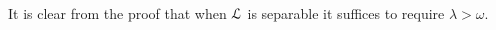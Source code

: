 \documentclass[10pt,oneside]{amsproc}
\newcommand{\mylabel}[1]{{#1}\hfill}
\renewenvironment{itemize}
  {\begin{list}{$\cdot$}{%
  \setlength{\parskip}{0mm}
  \setlength{\topsep}{.4\baselineskip}
  \setlength{\rightmargin}{0mm}
  \setlength{\listparindent}{0mm}
  \setlength{\itemindent}{0mm}
  \setlength{\labelwidth}{3ex}
  \setlength{\itemsep}{.2\baselineskip}
  \setlength{\parsep}{.2\baselineskip}
  \setlength{\partopsep}{0mm}
  \setlength{\labelsep}{1ex}
  \setlength{\leftmargin}{\labelwidth+\labelsep}
  \let\makelabel\mylabel}}{%
\end{list}}
\renewcommand*{\emph}[1]{%
   \smash{\tikz[baseline]\node[rectangle, fill=teal!25, rounded corners, inner xsep=0.5ex, inner ysep=0.2ex, anchor=base, minimum height = 2.7ex]{\strut #1};}}
\def\forallH{\forall}
\def\existsH{\exists}
\begin{document}
It is clear from the proof that when ${\EuScript L}$ is separable it suffices to require $\lambda>\omega$.

\begin{comment}
  
We say that the set $B$ is a \emph{Cauchy closure\/} of $A$ if 
\begin{itemize}
  \item[1.] every ${\sf I}$-invariant Cauchy type $p(x)\subseteq{\EuScript I}(A)$ is realized in $B$
  \item[2.] ${\EuScript I}\mbox{-tp}(b/A)$ is Cauchy for every $b\in B$.
\end{itemize}

\begin{proposition}\label{prop_Cauchyclosure}
  Assume $L_{\sf H}$ is a functional language.
  Let $M$ be model.
  Then any Cauchy closure of $M$ is a model.
\end{proposition}

\begin{proof} ???
\end{proof}
  {\color{blue}
  (messy/wrong/incomplete)
  We need a few easy observations.
  Let $a\sim_{\sf I}a'$ be finite tuples.
  Let $\langle a\rangle$ be the $L_{\sf H}$ substructure of $U$ generated by $a$.
  Then for every $b\in U\smallsetminus\langle a\rangle$ there is a $b'\in U\smallsetminus\langle a'\rangle$ such that $a,b\sim_{\sf I}a',b'$.
  In fact, $\sim_{\sf I}$-classes are infinite, hence they ave the cardinality of $U$.
  Therefore, by back-and-forth, $a\equiv a'$.
  We also have that for every formula $\varphi(x,z)$ and $b\in U\smallsetminus\big(\langle a\rangle\cup\big)$ 

  \ceq{}{~}{\forallH x\notin{\rm rng}(a,a')\big[\varphi(x,a)\leftrightarrow\varphi(x,a')\big].}

  Let $N$ be a Cauchy closure of $M$.
  We verify that $N$ satisfies (2) of Proposition~\ref{prop_Tarski_Vaught}.
  Let $\varphi(x,z)\in{\EuScript H}$ and $a\in N^{|z|}$ be be such that $\existsH x\ \varphi(x,a)$.
  We can assume that $a$ is a tuple of distinct elements.
  By the observations above
  
  \ceq{\hfill a\sim_{\sf I}z}{\rightarrow}{\forallH x\notin{\rm rng}(a,z)\big[\varphi(x,a)\leftrightarrow\varphi(x,z)\big]}

  By compactness,

  \ceq{\hfill a\sim_{t,D}z}{\rightarrow}{\forallH x\notin{\rm rng}(a,z)\big[\varphi'(x,a)\leftrightarrow\varphi'(x,z)\big]}


\end{comment}
\end{document}
